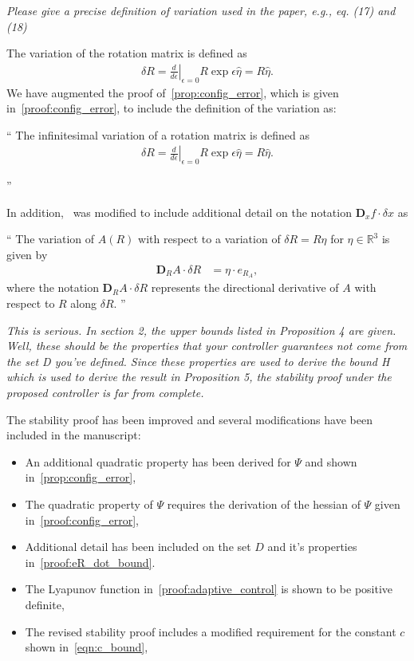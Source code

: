 \documentclass[11pt]{article}
\newcommand{\diff}[2]{\ensuremath{\frac{d #1}{d #2}}}
\newcommand{\dirDiff}[2]{\ensuremath{\mathbf{D}_{#2} #1 \cdot \delta #2}} %
\newcommand{\R}{\ensuremath{\mathbb{R}}}
\newenvironment{correction}{\begin{list}{}{\setlength{\leftmargin}{1cm}\setlength{\rightmargin}{1cm}}\vspace{\parsep}\item[]``}{''\end{list}}
\begin{document}
\begin{enumerate}
\item \textit{Please give a precise definition of variation used in the paper, e.g., eq. (17) and (18)}

The variation of the rotation matrix is defined as
\begin{align*}
    \delta R = \left. \diff{}{\epsilon} \right|_{\epsilon=0} R \exp{\epsilon \hat{\eta}} = R \hat{\eta} .
\end{align*}
We have augmented the proof of~\cref{prop:config_error}, which is given in~\cref{proof:config_error}, to include the definition of the variation as:
\begin{correction}
The infinitesimal variation of a rotation matrix is defined as
\begin{align*}
    \delta R = \left. \diff{}{\epsilon} \right|_{\epsilon=0} R \exp{\epsilon \hat{\eta}} = R \hat{\eta} .
\end{align*}

\end{correction}

In addition,~ was modified to include additional detail on the notation \( \dirDiff{f}{x}\) as
\begin{correction}
The variation of \( A(R) \) with respect to a variation of \( \delta R = R \hat{\eta} \) for \( \eta \in \R^3 \) is given by
	\begin{align}
		\dirDiff{A}{R} &= \eta \cdot e_{R_A} ,
	\end{align}
	where the notation \( \dirDiff{A}{R} \) represents the directional derivative of $A$ with respect to $R$ along $\delta R$.
	\end{correction}

\item \textit{This is serious. In section 2, the upper bounds listed in Proposition 4 are given. Well, these should be the properties that your controller guarantees not come from the set D you've defined. Since these properties are used to derive the bound H which is used to derive the result in Proposition 5, the stability proof under the proposed controller is far from complete.}

The stability proof has been improved and several modifications have been included in the manuscript:
\begin{itemize}
    \item An additional quadratic property has been derived for \( \Psi \) and shown in~\cref{prop:config_error},
    \item The quadratic property of \( \Psi \) requires the derivation of the hessian of \( \Psi \) given in~\cref{proof:config_error},
    \item Additional detail has been included on the set \( D \) and it's properties in~\cref{proof:eR_dot_bound}.
    \item The Lyapunov function in~\cref{proof:adaptive_control} is shown to be positive definite,
    \item The revised stability proof includes a modified requirement for the constant \( c \) shown in~\cref{eqn:c_bound},
\end{itemize}


\end{enumerate}
\end{document}
